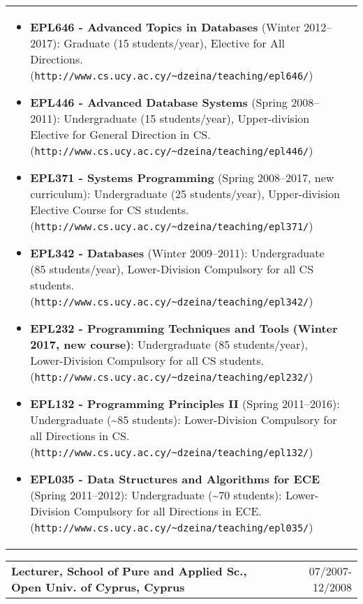 \documentclass[10pt]{article}
\begin{document}
\begin{tabular*}{1.0\textwidth} {@{\extracolsep{\fill}}ll}
\parbox[t]{12.2cm}{
\setlength{\itemsep}{0.05ex}
\begin{itemize}
    \item
        {\bf EPL646 - Advanced Topics in Databases} (Winter 2012--2017):
        Graduate (15 students/year), Elective for All Directions.
        ({\tt http://www.cs.ucy.ac.cy/\~{}dzeina/teaching/epl646/})
    \item 
        {\bf EPL446 - Advanced Database Systems} (Spring 2008--2011):
        Undergraduate (15 students/year), Upper-division Elective for General Direction in CS.
        ({\tt http://www.cs.ucy.ac.cy/\~{}dzeina/teaching/epl446/})        
    \item {\bf EPL371 - Systems Programming} (Spring 2008--2017, new curriculum):
        Undergraduate (25 students/year), Upper-division Elective Course for CS students.
        ({\tt http://www.cs.ucy.ac.cy/\~{}dzeina/teaching/epl371/})
    \item 
        {\bf EPL342 - Databases} (Winter 2009--2011):
        Undergraduate (85 students/year), Lower-Division Compulsory for all CS students.
        ({\tt http://www.cs.ucy.ac.cy/\~{}dzeina/teaching/epl342/})
    \item
        {\bf EPL232 - Programming Techniques and Tools} {\bf (Winter 2017, new course)}:
        Undergraduate (85 students/year), Lower-Division Compulsory for all CS students.
        ({\tt http://www.cs.ucy.ac.cy/\~{}dzeina/teaching/epl232/})
    \item
        {\bf EPL132 - Programming Principles II} (Spring 2011--2016):
        Undergraduate (\~{}85 students): Lower-Division Compulsory for all Directions in CS.
        ({\tt http://www.cs.ucy.ac.cy/\~{}dzeina/teaching/epl132/})        
    \item 
        {\bf EPL035 - Data Structures and Algorithms for ECE} (Spring 2011--2012):
        Undergraduate (\~{}70 students): Lower-Division Compulsory for all Directions in ECE.
        ({\tt http://www.cs.ucy.ac.cy/\~{}dzeina/teaching/epl035/})
\end{itemize}}
\end{tabular*}

\newpage
\begin{center} 
\begin{tabular*}{1.0\textwidth}%
   {@{\extracolsep{\fill}}lr}
{\bf Lecturer, School of Pure and Applied Sc., Open Univ. of Cyprus, Cyprus} 	&  	 07/2007-12/2008
\end{tabular*}
\end{center}
\end{document}
